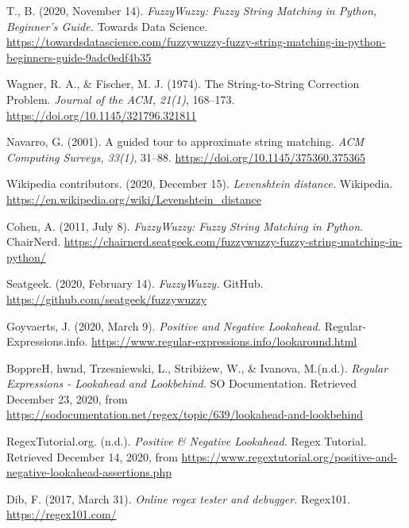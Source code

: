 \documentclass[technicalreport]{ieicej}
\begin{document}
%
%
\begin{thebibliography}{99}%
    T., B. (2020, November 14). \emph{FuzzyWuzzy: Fuzzy String Matching in Python, Beginner’s Guide.} Towards Data Science. \url{https://towardsdatascience.com/fuzzywuzzy-fuzzy-string-matching-in-python-beginners-guide-9adc0edf4b35}

    Wagner, R. A., \& Fischer, M. J. (1974). The String-to-String Correction Problem. \emph{Journal of the ACM, 21(1)}, 168–173. \url{https://doi.org/10.1145/321796.321811}

    Navarro, G. (2001). A guided tour to approximate string matching. \emph{ACM Computing Surveys, 33(1)}, 31–88. \url{https://doi.org/10.1145/375360.375365}

    Wikipedia contributors. (2020, December 15). \emph{Levenshtein distance.} Wikipedia. \url{https://en.wikipedia.org/wiki/Levenshtein_distance}

    Cohen, A. (2011, July 8). \emph{FuzzyWuzzy: Fuzzy String Matching in Python.} ChairNerd. \url{https://chairnerd.seatgeek.com/fuzzywuzzy-fuzzy-string-matching-in-python/}

    Seatgeek. (2020, February 14). \emph{FuzzyWuzzy.} GitHub. \url{https://github.com/seatgeek/fuzzywuzzy}

    Goyvaerts, J. (2020, March 9). \emph{Positive and Negative Lookahead.} Regular-Expressions.info. \url{https://www.regular-expressions.info/lookaround.html}

    BoppreH, hwnd, Trzesniewski, L., Stribiżew, W., \& Ivanova, M.(n.d.). \emph{Regular Expressions - Lookahead and Lookbehind.} SO Documentation. Retrieved December 23, 2020, from \url{https://sodocumentation.net/regex/topic/639/lookahead-and-lookbehind}

    RegexTutorial.org. (n.d.). \emph{Positive \& Negative Lookahead.} Regex Tutorial. Retrieved December 14, 2020, from \url{https://www.regextutorial.org/positive-and-negative-lookahead-assertions.php}

    Dib, F. (2017, March 31). \emph{Online regex tester and debugger.} Regex101. \url{https://regex101.com/}

\end{thebibliography}
\end{document}
